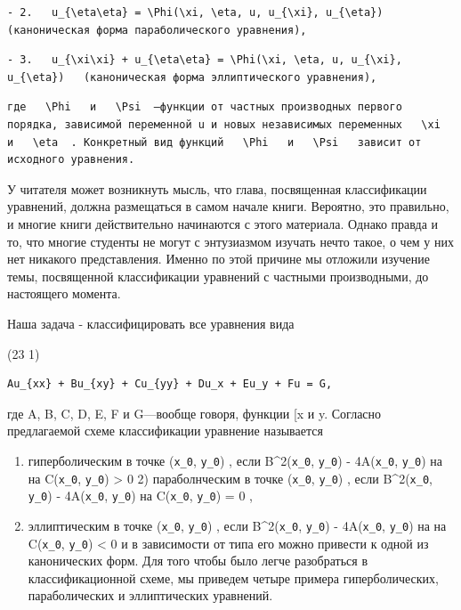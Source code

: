 \documentclass[
  ukrainian,
]{article}
\begin{document}
\begin{verbatim}
- 2.   u_{\eta\eta} = \Phi(\xi, \eta, u, u_{\xi}, u_{\eta})   (каноническая форма параболического уравнения),
\end{verbatim}

\begin{verbatim}
- 3.   u_{\xi\xi} + u_{\eta\eta} = \Phi(\xi, \eta, u, u_{\xi}, u_{\eta})   (каноническая форма эллиптического уравнения),
\end{verbatim}

\begin{verbatim}
где   \Phi   и   \Psi  —функции от частных производных первого порядка, зависимой переменной u и новых независимых переменных   \xi   и   \eta  . Конкретный вид функций   \Phi   и   \Psi   зависит от исходного уравнения.
\end{verbatim}

У читателя может возникнуть мысль, что глава, посвященная классификации
уравнений, должна размещаться в самом начале книги. Вероятно, это
правильно, и многие книги действительно начинаются с этого материала.
Однако правда и то, что многие студенты не могут с энтузиазмом изучать
нечто такое, о чем у них нет никакого представления. Именно по этой
причине мы отложили изучение темы, посвященной классификации уравнений с
частными производными, до настоящего момента.

Наша задача - классифицировать все уравнения вида

(23 1)

\begin{verbatim}
Au_{xx} + Bu_{xy} + Cu_{yy} + Du_x + Eu_y + Fu = G,
\end{verbatim}

где A, B, C, D, E, F и G---вообще говоря, функции {[}x и y. Согласно
предлагаемой схеме классификации уравнение называется

\begin{enumerate}
\def\labelenumi{\arabic{enumi})}
\item
  гиперболическим в точке (\texttt{x\_0}, \texttt{y\_0}) , если
  B\^{}2(\texttt{x\_0}, \texttt{y\_0}) - 4A(\texttt{x\_0},
  \texttt{y\_0})  на  на C(\texttt{x\_0},
  \texttt{y\_0}) \textgreater{} 0 2) параболнческим в точке
  (\texttt{x\_0}, \texttt{y\_0}) , если B\^{}2(\texttt{x\_0},
  \texttt{y\_0}) - 4A(\texttt{x\_0}, \texttt{y\_0})  на
  C(\texttt{x\_0}, \texttt{y\_0}) = 0 ,
\item
  эллиптическим в точке (\texttt{x\_0}, \texttt{y\_0}) , если
  B\^{}2(\texttt{x\_0}, \texttt{y\_0}) - 4A(\texttt{x\_0},
  \texttt{y\_0})  на  на C(\texttt{x\_0},
  \texttt{y\_0}) \textless{} 0 и в зависимости от типа его можно
  привести к одной из канонических форм. Для того чтобы было легче
  разобраться в классификационной схеме, мы приведем четыре примера
  гиперболических, параболических и эллиптических уравнений.
\end{enumerate}
\end{document}
